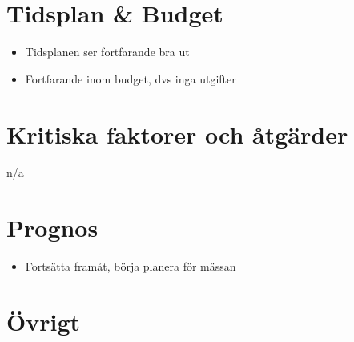 \section{Tidsplan \& Budget}
\begin{itemize}
\item Tidsplanen ser fortfarande bra ut
\item Fortfarande inom budget, dvs inga utgifter
\end{itemize}
\section{Kritiska faktorer och åtgärder}
n/a
\section{Prognos}
\begin{itemize}
\item Fortsätta framåt, börja planera för mässan
\end{itemize}
\section{Övrigt}
